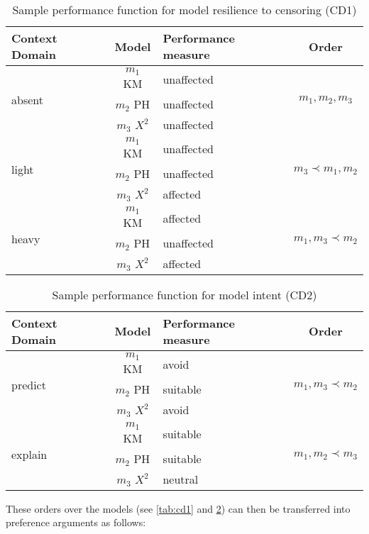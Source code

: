\begin{table}[t]
	\centering
	\begin{tabular}{|l|c|l|c|}
	\hline
	Context Domain 			& Model 			& Performance measure & Order\\
	\hline\hline
	\multirow{3}{*}{absent} & $m_1$ KM 		& unaffected		& 	\multirow{3}{*}{$m_1, m_2, m_3$}\\
							& $m_2$ PH		& unaffected		&\\
							& $m_3$ $X^2$	& unaffected		&\\
	\hline
	\multirow{3}{*}{light} 	& $m_1$ KM 		& unaffected		& \multirow{3}{*}{$m_3 \prec m_1, m_2$}\\
							& $m_2$ PH		& unaffected		&\\
							& $m_3$ $X^2$	& affected		&\\
	\hline
	\multirow{3}{*}{heavy} 	& $m_1$ KM 		& affected		& \multirow{3}{*}{$m_1, m_3 \prec m_2$}\\
							& $m_2$ PH		& unaffected		&\\
							& $m_3$ $X^2$	& affected		&\\
	\hline
	\end{tabular}
	\caption{Sample performance function for model resilience to censoring (CD1)}
	\label{tab:cd1}
\end{table}


\begin{table}[b]
	\centering
	\begin{tabular}{|l|c|l|c|}
	\hline
	Context Domain 			& Model 			& Performance measure & Order\\
	\hline\hline
	\multirow{3}{*}{predict}& $m_1$ KM 		& avoid		& \multirow{3}{*}{$m_1, m_3 \prec m_2$}\\
							& $m_2$ PH		& suitable	&\\
							& $m_3$ $X^2$	& avoid		&\\
	\hline
	\multirow{3}{*}{explain}& $m_1$ KM 		& suitable	& \multirow{3}{*}{$m_1, m_2 \prec m_3$}\\
							& $m_2$ PH		& suitable	&\\
							& $m_3$ $X^2$	& neutral	&\\
	\hline
	\end{tabular}
	\caption{Sample performance function for model intent (CD2)}
	\label{tab:cd2}
\end{table}

These orders over the models (see \autoref{tab:cd1} and \ref{tab:cd2}) can then be transferred into preference arguments as follows:

